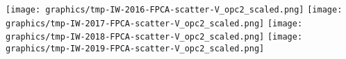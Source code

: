 
\clearpage
\begin{center}
\begin{minipage}{7.0in}
\texttt{[image: graphics/tmp-IW-2016-FPCA-scatter-V\_opc2\_scaled.png]}
\quad
\texttt{[image: graphics/tmp-IW-2017-FPCA-scatter-V\_opc2\_scaled.png]}
\vskip 1.0cm
\texttt{[image: graphics/tmp-IW-2018-FPCA-scatter-V\_opc2\_scaled.png]}
\quad
\texttt{[image: graphics/tmp-IW-2019-FPCA-scatter-V\_opc2\_scaled.png]}
\end{minipage}
\end{center}


\renewcommand{\theenumi}{\roman{enumi}}
\renewcommand{\labelenumi}{\textnormal{(\theenumi)}$\;\;$}


